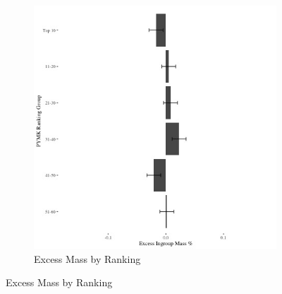 \documentclass[12pt,letterpaper]{article}
\begin{document}
\begin{figure}[ht]
\begin{subfigure}{.5\textwidth}
        \includegraphics[width=.9\linewidth]{Output/Graphs/Audit/Excess Mass/US PYMK excess mass by ranking group.jpg}  
        \caption{Excess Mass by Ranking}
        \label{fig:pymk_bygroup_em}
    \end{subfigure}

\end{figure}
\end{document}
